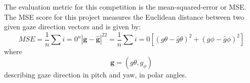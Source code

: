 \documentclass[11pt]{document}
\begin{document}
The evaluation metric for this competition is the mean-squared-error or MSE. The MSE score for this project measures the Euclidean distance between two given gaze direction vectors and is given by:
$$ \begin{equation}
MSE = \frac{1}{n} \sum{i=0}^n | \mathbf{g} - \hat{\mathbf{g}} |^22
= \frac{1}{n} \sum{i=0} \left[ \left(g\theta - \hat g\theta\right)^2 + \left(g\phi - \hat g\phi\right)^2 \right] \end{equation}
$$where$$ \begin{equation} \mathbf{g} = \left(g\theta, g_\phi\right)
\end{equation}$$ describing gaze direction in pitch and yaw, in polar angles.
\end{document}
